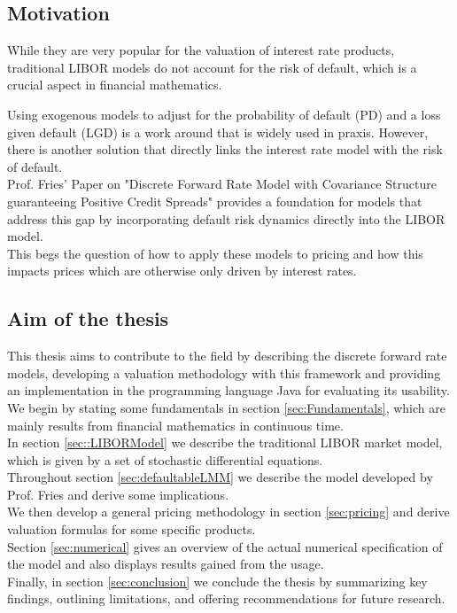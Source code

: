 \documentclass[12pt]{article}
\begin{document}
	
	\subsection{Motivation}
	While they are very popular for the valuation of interest rate products, traditional LIBOR models do not account for the risk of default, which is a crucial aspect in financial mathematics. 
	
	Using exogenous models to adjust for the probability of default (PD) and a loss given default (LGD) is a work around that is widely used in praxis. However, there is another solution that directly links the interest rate model with the risk of default.\\
	Prof. Fries' Paper on "Discrete Forward Rate Model with	Covariance Structure guaranteeing Positive Credit Spreads" \cite{friesDLMM} provides a foundation for models that address this gap by incorporating default risk dynamics directly into the LIBOR model.\\
	This begs the question of how to apply these models to pricing and how this impacts prices which are otherwise only driven by interest rates.
	
	\subsection{Aim of the thesis}
	
	This thesis aims to contribute to the field by describing the discrete forward rate models, developing a valuation methodology with this framework and providing an implementation in the programming language Java for evaluating its usability.\\
	
	We begin by stating some fundamentals in section \ref{sec:Fundamentals}, which are mainly results from financial mathematics in continuous time.\\
	In section \ref{sec::LIBORModel} we describe the traditional LIBOR market model, which is given by a set of stochastic differential equations.\\
	Throughout section \ref{sec:defaultableLMM} we describe the model developed by Prof. Fries and derive some implications.\\
	We then develop a general pricing methodology in section \ref{sec:pricing} and derive valuation formulas for some specific products.\\
	Section \ref{sec:numerical} gives an overview of the actual numerical specification of the model and also displays results gained from the usage.\\
	Finally, in section \ref{sec:conclusion} we conclude the thesis by summarizing key findings, outlining limitations, and offering recommendations for future research.
	
\end{document}
